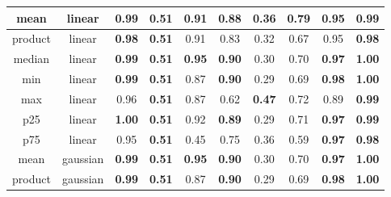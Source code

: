 \begin{table*}[!b]
\begin{tabular}{|c|c|c|c|c|c|c|c|c|c|}
        \hline
                    mean &          linear &                \textbf{0.99} &             \textbf{0.51} &                   0.91 &             \textbf{0.88} &                        0.36 &            \textbf{0.79} &                  0.95 &          \textbf{0.99} \\
        \hline
                product &          linear &                \textbf{0.98} &             \textbf{0.51} &                   0.91 &                      0.83 &                        0.32 &                     0.67 &                  0.95 &          \textbf{0.98} \\
        \hline
                    median &          linear &                \textbf{0.99} &             \textbf{0.51} &          \textbf{0.95} &             \textbf{0.90} &                        0.30 &                     0.70 &         \textbf{0.97} &          \textbf{1.00} \\
        \hline
                    min &          linear &                \textbf{0.99} &             \textbf{0.51} &                   0.87 &             \textbf{0.90} &                        0.29 &                     0.69 &         \textbf{0.98} &          \textbf{1.00} \\
        \hline
                    max &          linear &                         0.96 &             \textbf{0.51} &                   0.87 &                      0.62 &               \textbf{0.47} &                     0.72 &                  0.89 &          \textbf{0.99} \\
        \hline
                    p25 &          linear &                \textbf{1.00} &             \textbf{0.51} &                   0.92 &             \textbf{0.89} &                        0.29 &                     0.71 &         \textbf{0.97} &          \textbf{0.99} \\
        \hline
                    p75 &          linear &                         0.95 &             \textbf{0.51} &                   0.45 &                      0.75 &                        0.36 &                     0.59 &         \textbf{0.97} &          \textbf{0.98} \\
        \hline
                    mean &        gaussian &                \textbf{0.99} &             \textbf{0.51} &          \textbf{0.95} &             \textbf{0.90} &                        0.30 &                     0.70 &         \textbf{0.97} &          \textbf{1.00} \\
        \hline
                product &        gaussian &                \textbf{0.99} &             \textbf{0.51} &                   0.87 &             \textbf{0.90} &                        0.29 &                     0.69 &         \textbf{0.98} &          \textbf{1.00} \\

\end{tabular}
\end{table*}

